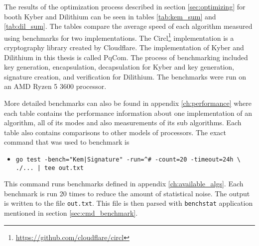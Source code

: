 The results of the optimization process described in section \ref{sec:optimizing} for booth Kyber and Dilithium can be seen in tables \ref{tab:kem_sum} and \ref{tab:dil_sum}. The tables compare the average speed of each algorithm measured using benchmarks for two implementations. The Circl\footnote{\url{https://github.com/cloudflare/circl}} implementation is a cryptography library created by Cloudflare. The implementation of Kyber and Dilithium in this thesis is called PqCom. The process of benchmarking included key generation, encapsulation, decapsulation for Kyber and key generation, signature creation, and verification for Dilithium. The benchmarks were run on an AMD Ryzen 5 3600 processor.


More detailed benchmarks can also be found in appendix \ref{ch:performance} where each table contains the performance information about one implementation of an algorithm, all of its modes and also measurements of its sub algorithms. Each table also contains comparisons to other models of processors. The exact command that was used to benchmark is
\begin{itemize}
  \item \texttt{go test -bench="Kem|Signature" -run=\^{}\# -count=20 -timeout=24h \textbackslash\\ ./... | tee out.txt}
\end{itemize}
This command runs benchmarks defined in appendix \ref{ch:available_algs}. Each benchmark is run 20 times to reduce the amount of statistical noise. The output is written to the file \texttt{out.txt}. This file is then parsed with \texttt{benchstat} application mentioned in section \ref{sec:cmd_benchmark}.
